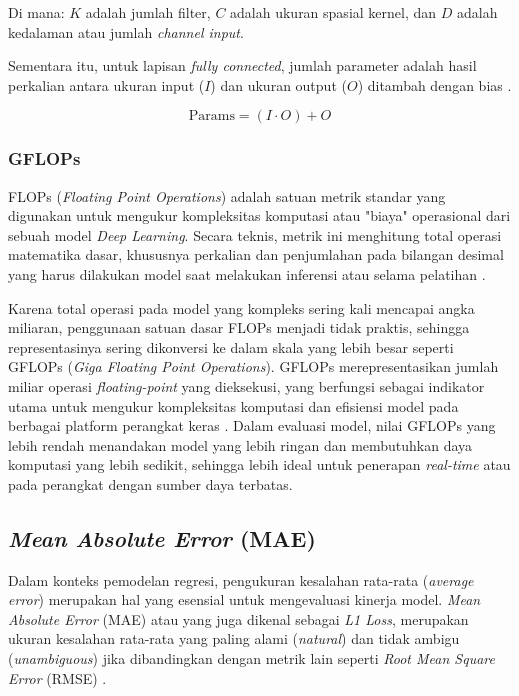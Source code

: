Di mana: $K$ adalah jumlah filter, $C$ adalah ukuran spasial kernel, dan $D$ adalah kedalaman atau jumlah \textit{channel input}.

Sementara itu, untuk lapisan \textit{fully connected}, jumlah parameter adalah hasil perkalian antara ukuran input ($I$) dan ukuran output ($O$) ditambah dengan bias \cite{DBLP:journals/corr/abs-2103-05251}.

\begin{equation}
    \text{Params} = (I \cdot O) + O
\end{equation}

\subsubsection{GFLOPs}
FLOPs (\textit{Floating Point Operations}) adalah satuan metrik standar yang digunakan untuk mengukur kompleksitas komputasi atau "biaya" operasional dari sebuah model \textit{Deep Learning}. Secara teknis, metrik ini menghitung total operasi matematika dasar, khususnya perkalian dan penjumlahan pada bilangan desimal yang harus dilakukan model saat melakukan inferensi atau selama pelatihan \cite{DBLP:journals/corr/abs-2103-05251}.

Karena total operasi pada model yang kompleks sering kali mencapai angka miliaran, penggunaan satuan dasar FLOPs menjadi tidak praktis, sehingga representasinya sering dikonversi ke dalam skala yang lebih besar seperti GFLOPs (\textit{Giga Floating Point Operations}). GFLOPs merepresentasikan jumlah miliar operasi \textit{floating-point} yang dieksekusi, yang berfungsi sebagai indikator utama untuk mengukur kompleksitas komputasi dan efisiensi model pada berbagai platform perangkat keras \cite{10.1371/journal.pone.0324439}. Dalam evaluasi model, nilai GFLOPs yang lebih rendah menandakan model yang lebih ringan dan membutuhkan daya komputasi yang lebih sedikit, sehingga lebih ideal untuk penerapan \textit{real-time} atau pada perangkat dengan sumber daya terbatas.

\subsection{\textit{Mean Absolute Error} (MAE)}
Dalam konteks pemodelan regresi, pengukuran kesalahan rata-rata (\textit{average error}) merupakan hal yang esensial untuk mengevaluasi kinerja model. \textit{Mean Absolute Error} (MAE) atau yang juga dikenal sebagai \textit{L1 Loss}, merupakan ukuran kesalahan rata-rata yang paling alami (\textit{natural}) dan tidak ambigu (\textit{unambiguous}) jika dibandingkan dengan metrik lain seperti \textit{Root Mean Square Error} (RMSE) \cite{willmott2005advantages}. 

